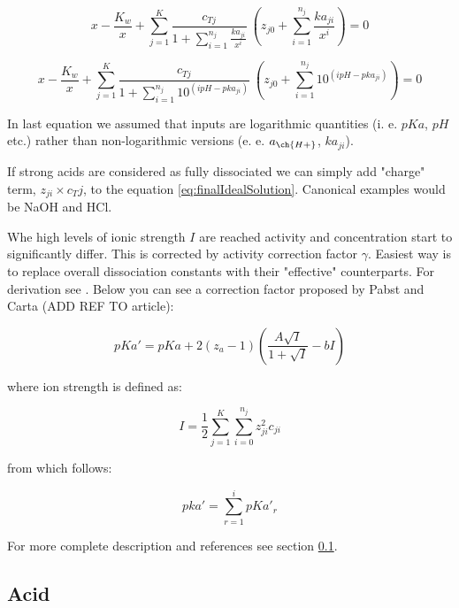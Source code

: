 \begin{equation}
    x - \frac{K_w}{x} + \sum_{j=1}^{K}\frac{c_{Tj}}{1+\sum_{i=1}^{n_j}\frac{ka_{ji}}{x^i}} \
    \left(z_{j0} + \sum_{i=1}^{n_j}\frac{ka_{ji}}{x^i}\right) = 0
\end{equation}

\begin{equation}\label{eq:finalIdealSolution}
    x - \frac{K_w}{x} + \sum_{j=1}^{K}\frac{c_{Tj}}{1+\sum_{i=1}^{n_j}10^{(i pH - pka_{ji})}} \
    \left(z_{j0} + \sum_{i=1}^{n_j} 10^{(i pH - pka_{ji})}\right) = 0
\end{equation}

In last equation we assumed that inputs are logarithmic quantities (i. e. $pKa$, $pH$ etc.) rather than
non-logarithmic versions (e. e. $a_{\ch{H+}}$, $ka_{ji}$).

If strong acids are considered as fully dissociated we can simply add "charge" term, $z_{ji}\times c_Tj$, to the
equation \eqref{eq:finalIdealSolution}. Canonical examples would be NaOH and HCl.

Whe high levels of ionic strength $I$ are reached activity and concentration start to significantly differ.
This is corrected by activity correction factor $\gamma$. Easiest way is to replace overall dissociation
constants with their "effective" counterparts. For derivation see . Below you can see a correction factor
proposed by Pabst and Carta (ADD REF TO article):

\begin{equation}
    pKa' = pKa + 2(z_a-1)\left(\frac{A\sqrt{I}}{1+\sqrt{I}} - bI\right)
\end{equation}

where ion strength is defined as:

\begin{equation}
    I = \frac{1}{2} \sum_{j=1}^{K} \sum_{i=0}^{n_j} z_{ji}^2 c_{ji}
\end{equation}

from which follows:

\begin{equation}
    pka' = \sum_{r=1}^{i} pKa'_r
\end{equation}

For more complete description and references see section \ref{}.

\subsection{Acid}

